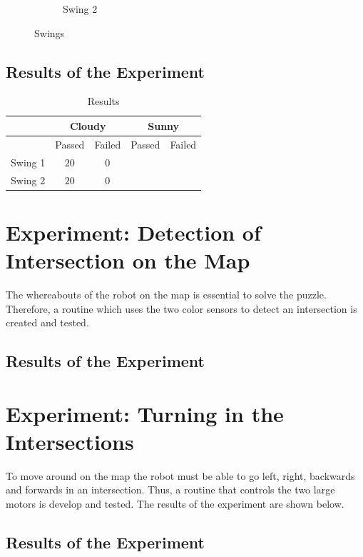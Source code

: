 \documentclass[../report.tex]{subfiles}
\begin{document}
\begin{figure}[H]
\begin{subfigure}{0.5\textwidth}
        \caption{Swing 2}
        \label{fig:line_follower_swing2}
    \end{subfigure}
    \caption{Swings}
    \label{fig:line_follower}
\end{figure}
\subsection*{Results of the Experiment}

\begin{table}[H]
\centering
\begin{tabular}{|c|c|c|c|c|}
\hline
 & \multicolumn{2}{c|}{Cloudy} & \multicolumn{2}{c|}{Sunny} \\ \hline
 & Passed & Failed & Passed & Failed \\ \hline
Swing 1 & $20$ & $0$ &  &  \\ \hline
Swing 2 & $20$ & $0$  &  &  \\ \hline
\end{tabular}
\caption{Results}
\label{tab:follow_line_results}
\end{table}

\section{Experiment: Detection of Intersection on the Map} \label{app:intersection}
The whereabouts of the robot on the map is essential to solve the puzzle. Therefore, a routine which uses the two color sensors to detect an intersection is created and tested. 

\subsection*{Results of the Experiment} 

\section{Experiment: Turning in the Intersections} \label{app:turning}
To move around on the map the robot must be able to go left, right, backwards and forwards in an intersection. Thus, a routine that controls the two large motors is develop and tested. The results of the experiment are shown below.

\subsection*{Results of the Experiment}
\end{document}
